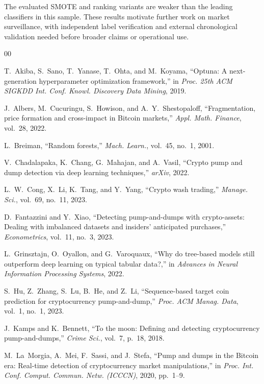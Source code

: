 \documentclass{ieeeaccess}
\begin{document}
The evaluated SMOTE and ranking variants are weaker than the leading classifiers in this sample. These results motivate further work on market surveillance, with independent label verification and external chronological validation needed before broader claims or operational use.


\begin{thebibliography}{00}

 T.~Akiba, S.~Sano, T.~Yanase, T.~Ohta, and M.~Koyama, ``Optuna: A next-generation hyperparameter optimization framework,'' in \emph{Proc. 25th ACM SIGKDD Int. Conf. Knowl. Discovery Data Mining}, 2019.

 J.~Albers, M.~Cucuringu, S.~Howison, and A.~Y.~Shestopaloff, ``Fragmentation, price formation and cross-impact in Bitcoin markets,'' \emph{Appl. Math. Finance}, vol.~28, 2022.

 L.~Breiman, ``Random forests,'' \emph{Mach. Learn.}, vol.~45, no.~1, 2001.

 V.~Chadalapaka, K.~Chang, G.~Mahajan, and A.~Vasil, ``Crypto pump and dump detection via deep learning techniques,'' \emph{arXiv}, 2022.

 L.~W.~Cong, X.~Li, K.~Tang, and Y.~Yang, ``Crypto wash trading,'' \emph{Manage. Sci.}, vol.~69, no.~11, 2023.

 D.~Fantazzini and Y.~Xiao, ``Detecting pump-and-dumps with crypto-assets: Dealing with imbalanced datasets and insiders' anticipated purchases,'' \emph{Econometrics}, vol.~11, no.~3, 2023.

 L.~Grinsztajn, O.~Oyallon, and G.~Varoquaux, ``Why do tree-based models still outperform deep learning on typical tabular data?,'' in \emph{Advances in Neural Information Processing Systems}, 2022.

 S.~Hu, Z.~Zhang, S.~Lu, B.~He, and Z.~Li, ``Sequence-based target coin prediction for cryptocurrency pump-and-dump,'' \emph{Proc. ACM Manag. Data}, vol.~1, no.~1, 2023.

 J.~Kamps and K.~Bennett, ``To the moon: Defining and detecting cryptocurrency pump-and-dumps,'' \emph{Crime Sci.}, vol.~7, p.~18, 2018.

 M.~La~Morgia, A.~Mei, F.~Sassi, and J.~Stefa, ``Pump and dumps in the Bitcoin era: Real-time detection of cryptocurrency market manipulations,'' in \emph{Proc. Int. Conf. Comput. Commun. Netw. (ICCCN)}, 2020, pp.~1--9.


\end{thebibliography}
\end{document}

